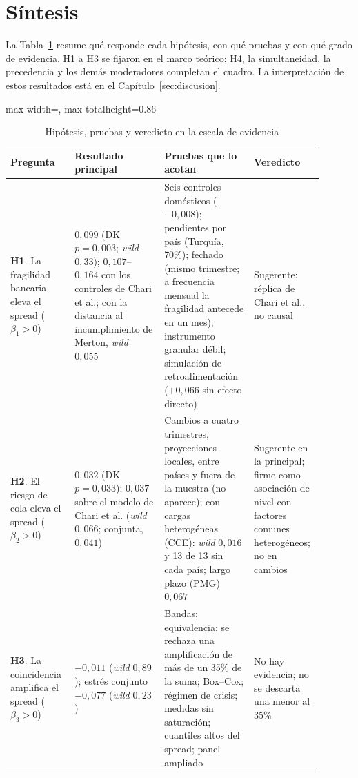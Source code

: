 \section{Síntesis}
\label{sec:sintesis-resultados}

La Tabla~\ref{tab:veredictos} resume qué responde cada hipótesis, con qué pruebas y con qué grado de evidencia. H1 a H3 se fijaron en el marco teórico; H4, la simultaneidad, la precedencia y los demás moderadores completan el cuadro. La interpretación de estos resultados está en el Capítulo~\ref{sec:discusion}.

\begin{table}[p]
\centering
\scriptsize
\caption[Hipótesis, pruebas y veredicto]{Hipótesis, pruebas y veredicto en la escala de evidencia}
\label{tab:veredictos}
\begin{adjustbox}{max width=\linewidth, max totalheight=0.86\textheight}
\begin{tabular}{>{\raggedright\arraybackslash}p{0.19\linewidth}>{\raggedright\arraybackslash}p{0.27\linewidth}>{\raggedright\arraybackslash}p{0.27\linewidth}>{\raggedright\arraybackslash}p{0.17\linewidth}}
\toprule
Pregunta & Resultado principal & Pruebas que lo acotan & Veredicto \\
\midrule
\textbf{H1}. La fragilidad bancaria eleva el spread ($\beta_1>0$) & $0{,}099$ (DK $p=0{,}003$; \textit{wild} $0{,}33$); $0{,}107$--$0{,}164$ con los controles de Chari et al.; con la distancia al incumplimiento de Merton, \textit{wild} $0{,}055$ & Seis controles domésticos ($-0{,}008$); pendientes por país (Turquía, 70\%); fechado (mismo trimestre; a frecuencia mensual la fragilidad antecede en un mes); instrumento granular débil; simulación de retroalimentación ($+0{,}066$ sin efecto directo) & Sugerente: réplica de Chari et al., no causal \\
\addlinespace
\textbf{H2}. El riesgo de cola eleva el spread ($\beta_2>0$) & $0{,}032$ (DK $p=0{,}033$); $0{,}037$ sobre el modelo de Chari et al. (\textit{wild} $0{,}066$; conjunta, $0{,}041$) & Cambios a cuatro trimestres, proyecciones locales, entre países y fuera de la muestra (no aparece); con cargas heterogéneas (CCE): \textit{wild} $0{,}016$ y 13 de 13 sin cada país; largo plazo (PMG) $0{,}067$ & Sugerente en la principal; firme como asociación de nivel con factores comunes heterogéneos; no en cambios \\
\addlinespace
\textbf{H3}. La coincidencia amplifica el spread ($\beta_3>0$) & $-0{,}011$ (\textit{wild} $0{,}89$); estrés conjunto $-0{,}077$ (\textit{wild} $0{,}23$) & Bandas; equivalencia: se rechaza una amplificación de más de un 35\% de la suma; Box--Cox; régimen de crisis; medidas sin saturación; cuantiles altos del spread; panel ampliado & No hay evidencia; no se descarta una menor al 35\% \\

\end{tabular}
\end{adjustbox}
\end{table}

